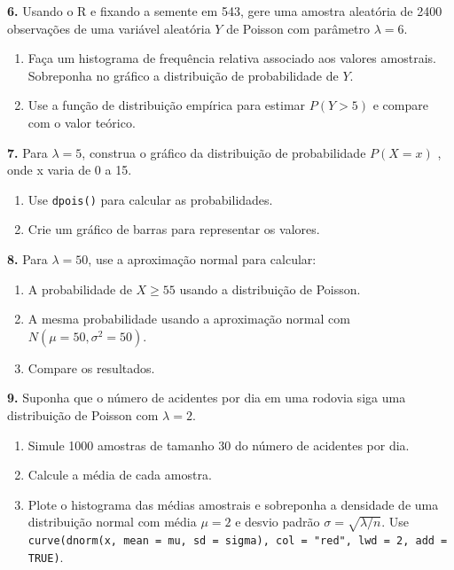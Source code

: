 \documentclass[
]{book}
\begin{document}
\textbf{6.} Usando o R e fixando a semente em 543, gere uma amostra aleatória
de 2400 observações de uma variável aleatória \(Y\) de Poisson com
parâmetro \(\lambda = 6\).

\begin{enumerate}
\def\labelenumi{(\alph{enumi})}
\item
  Faça um histograma de frequência relativa associado aos valores
  amostrais. Sobreponha no gráfico a distribuição de probabilidade de \(Y\).
\item
  Use a função de distribuição empírica para estimar \(P(Y > 5)\) e
  compare com o valor teórico.
\end{enumerate}

\textbf{7.} Para \(\lambda = 5\), construa o gráfico da distribuição de probabilidade \(P(X = x)\) , onde x varia de 0 a 15.

\begin{enumerate}
\def\labelenumi{(\alph{enumi})}
\item
  Use \texttt{dpois()} para calcular as probabilidades.
\item
  Crie um gráfico de barras para representar os valores.
\end{enumerate}

\textbf{8.} Para \(\lambda = 50\), use a aproximação normal para calcular:

\begin{enumerate}
\def\labelenumi{(\alph{enumi})}
\item
  A probabilidade de \(X \geq 55\) usando a distribuição de Poisson.
\item
  A mesma probabilidade usando a aproximação normal com \(N(\mu = 50, \sigma^2 = 50)\).
\item
  Compare os resultados.
\end{enumerate}

\textbf{9.} Suponha que o número de acidentes por dia em uma rodovia siga uma distribuição de Poisson com \(\lambda = 2\).

\begin{enumerate}
\def\labelenumi{(\alph{enumi})}
\item
  Simule 1000 amostras de tamanho 30 do número de acidentes por dia.
\item
  Calcule a média de cada amostra.
\item
  Plote o histograma das médias amostrais e sobreponha a densidade de uma distribuição normal com média \(\mu = 2\) e desvio padrão \(\sigma = \sqrt{\lambda / n}\). Use \texttt{curve(dnorm(x,\ mean\ =\ mu,\ sd\ =\ sigma),\ col\ =\ "red",\ lwd\ =\ 2,\ add\ =\ TRUE)}.
\end{enumerate}
\end{document}

